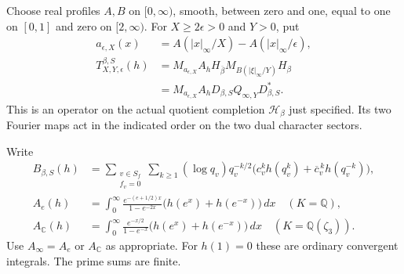 Choose real profiles $A,B$ on $[0,\infty)$, smooth,
between zero and one, equal to one on $[0,1]$ and
zero on $[2,\infty)$.
For $X\ge2\epsilon>0$ and $Y>0$, put
\[
\begin{aligned}
 a_{\epsilon,X}(x)
       &=A(|x|_\infty/X)-A(|x|_\infty/\epsilon),\\
 T^{\beta,S}_{X,Y,\epsilon}(h)
       &=M_{a_{\epsilon,X}}A_h
          H_{\overline\beta}M_{B(|\xi|_\infty/Y)}H_\beta\\
       &=M_{a_{\epsilon,X}}A_h
                    D_{\beta,S}Q_{\infty,Y}D_{\beta,S}^* .
\end{aligned}
\tag{MA-CQ.20}
\]
This is an operator on the actual quotient completion
$\mathscr H_\beta$ just specified.
Its two Fourier maps act in the indicated order on
the two dual character sectors.

Write
\[
\begin{aligned}
 B_{\beta,S}(h)
   &=\sum_{\substack{v\in S_f\\ f_v=0}}\sum_{k\ge1}
      (\log q_v)q_v^{-k/2}
        \bigl(c_v^kh(q_v^k)+\overline c_v^{\,k}h(q_v^{-k})\bigr),\\
 A_e(h)&=\int_0^\infty
       \frac{e^{-(e+1/2)x}}{1-e^{-2x}}
                       \bigl(h(e^x)+h(e^{-x})\bigr)\,dx
                   \quad(K=\mathbb Q),\\
 A_{\mathbb C}(h)&=\int_0^\infty
       \frac{e^{-x/2}}{1-e^{-x}}
                       \bigl(h(e^x)+h(e^{-x})\bigr)\,dx
                   \quad(K=\mathbb Q(\zeta_3)).
\end{aligned}
\tag{MA-CQ.21}
\]
Use $A_\infty=A_e$ or $A_{\mathbb C}$ as appropriate.
For $h(1)=0$ these are ordinary convergent integrals.
The prime sums are finite.

